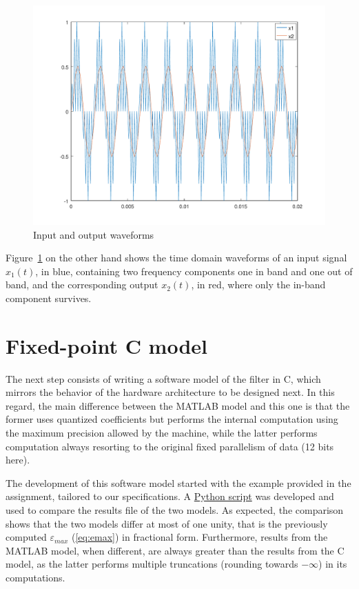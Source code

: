 \documentclass[a4paper]{article}
\begin{document}
\begin{figure}[hbtp]
    \centering
    \includegraphics[width=.8\linewidth]{media/sine.pdf}
    \caption{Input and output waveforms}
    \label{fig:sine}
\end{figure}
Figure~\ref{fig:sine} on the other hand shows the time domain waveforms of an input signal $x_1(t)$, in blue, containing two frequency components one in band and one out of band, and the corresponding output $x_2(t)$, in red, where only the in-band component survives.

\section{Fixed-point C model}
The next step consists of writing a software model of the filter in C, which mirrors the behavior of the hardware architecture to be designed next. In this regard, the main difference between the MATLAB model and this one is that the former uses quantized coefficients but performs the internal computation using the maximum precision allowed by the machine, while the latter performs computation always resorting to the original fixed parallelism of data (12 bits here).

The development of this software model started with the example provided in the assignment, tailored to our specifications. A \href{https://github.com/mksoc/ISA-filter-design/blob/master/common/compare-outputs.py}{Python script} was developed and used to compare the results file of the two models. As expected, the comparison shows that the two models differ at most of one unity, that is the previously computed $\varepsilon_{max}$ (\ref{eq:emax}) in fractional form. Furthermore, results from the MATLAB model, when different, are always greater than the results from the C model, as the latter performs multiple truncations (rounding towards $-\infty$) in its computations. 
\end{document}
